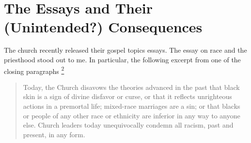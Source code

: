 \documentclass[a4paper]{article}
\providecommand*{\DUfootnotemark}[3]{%
  \raisebox{1em}{\hypertarget{#1}{}}%
  \hyperlink{#2}{\textsuperscript{#3}}%
}
\begin{document}
\section{The Essays and Their (Unintended?) Consequences%
  \label{the-essays-and-their-unintended-consequences}%
}

The church recently released their gospel topics essays.  The essay on race and the priesthood stood out to me.  In particular, the following excerpt from one of the closing paragraphs\DUfootnotemark{id2}{id13}{2}
%
\begin{quote}

Today, the Church disavows the theories advanced in the past that black skin is a sign of divine disfavor or curse, or that it reflects unrighteous actions in a premortal life; mixed-race marriages are a sin; or that blacks or people of any other race or ethnicity are inferior in any way to anyone else.  Church leaders today unequivocally condemn all racism, past and present, in any form.

\end{quote}
\end{document}
